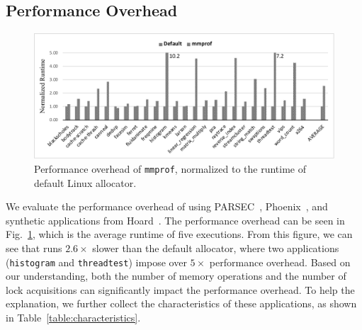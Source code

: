  








\subsection{Performance Overhead}
\label{sec:perf}

\begin{figure}[!ht]
\centering
\includegraphics[width=\columnwidth]{figures/perfoverhead}
\caption{Performance overhead of \texttt{mmprof}, normalized to the runtime of default Linux allocator.\label{fig:overhead}}
\end{figure}

We evaluate the performance overhead of 
\MP{} using PARSEC~\citep{parsec},  Phoenix~\citep{phoenix}, and synthetic applications from Hoard~\cite{Hoard}. The performance overhead can be seen in Fig.~\ref{fig:overhead}, which is the average runtime of five executions. From this figure, we can see that \MP{} runs $2.6\times$ slower than the default allocator, where two applications (\texttt{histogram} and \texttt{threadtest}) impose over $5\times$ performance overhead. Based on our understanding, both the number of memory operations and the number of lock acquisitions can significantly impact the performance overhead. To help the explanation, we further collect the characteristics of these applications, as shown in Table~\ref{table:characteristics}.  


